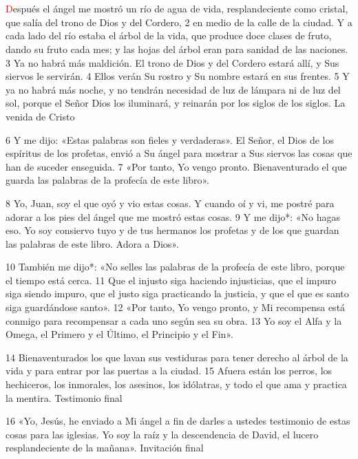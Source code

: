 \documentclass[12pt,twocolumn,twoside]{book}
\begin{document}
\chapter{}
\lettrine[lines=4]{\textcolor{red}{D}}{}espués el ángel me mostró un río de agua de vida, resplandeciente como cristal, que salía del trono de Dios y del Cordero, 2 en medio de la calle de la ciudad. Y a cada lado del río estaba el árbol de la vida, que produce doce clases de fruto, dando su fruto cada mes; y las hojas del árbol eran para sanidad de las naciones. 3 Ya no habrá más maldición. El trono de Dios y del Cordero estará allí, y Sus siervos le servirán. 4 Ellos verán Su rostro y Su nombre estará en sus frentes. 5 Y ya no habrá más noche, y no tendrán necesidad de luz de lámpara ni de luz del sol, porque el Señor Dios los iluminará, y reinarán por los siglos de los siglos.
La venida de Cristo

6 Y me dijo: «Estas palabras son fieles y verdaderas». El Señor, el Dios de los espíritus de los profetas, envió a Su ángel para mostrar a Sus siervos las cosas que han de suceder enseguida. 7 «Por tanto, Yo vengo pronto. Bienaventurado el que guarda las palabras de la profecía de este libro».

8 Yo, Juan, soy el que oyó y vio estas cosas. Y cuando oí y vi, me postré para adorar a los pies del ángel que me mostró estas cosas. 9 Y me dijo*: «No hagas eso. Yo soy consiervo tuyo y de tus hermanos los profetas y de los que guardan las palabras de este libro. Adora a Dios».

10 También me dijo*: «No selles las palabras de la profecía de este libro, porque el tiempo está cerca. 11 Que el injusto siga haciendo injusticias, que el impuro siga siendo impuro, que el justo siga practicando la justicia, y que el que es santo siga guardándose santo». 12 «Por tanto, Yo vengo pronto, y Mi recompensa está conmigo para recompensar a cada uno según sea su obra. 13 Yo soy el Alfa y la Omega, el Primero y el Último, el Principio y el Fin».

14 Bienaventurados los que lavan sus vestiduras para tener derecho al árbol de la vida y para entrar por las puertas a la ciudad. 15 Afuera están los perros, los hechiceros, los inmorales, los asesinos, los idólatras, y todo el que ama y practica la mentira.
Testimonio final

16 «Yo, Jesús, he enviado a Mi ángel a fin de darles a ustedes testimonio de estas cosas para las iglesias. Yo soy la raíz y la descendencia de David, el lucero resplandeciente de la mañana».
Invitación final
\end{document}
